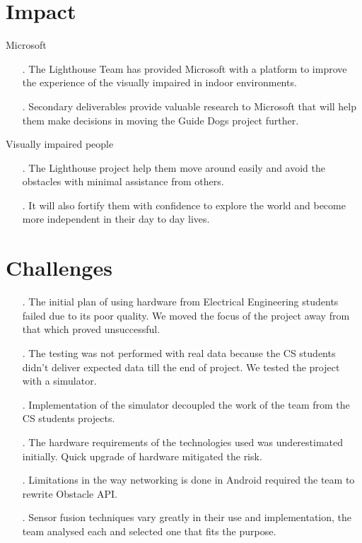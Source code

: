 \documentclass[prodmode,acmtosem]{acmsmall} %
\begin{document}
\section{Impact}
Microsoft
\begin{itemize}
\item[.] The Lighthouse Team has provided Microsoft with a platform to improve the experience of the visually impaired in indoor environments.
\item[.] Secondary deliverables provide valuable research to Microsoft that will help them make decisions in moving the Guide Dogs project further.
\end{itemize}
Visually impaired people
\begin{itemize}
\item[.] The Lighthouse project help them move around easily and avoid the obstacles with minimal assistance from others.
\item[.] It will also fortify them with confidence to explore the world and become more independent in their day to day lives.
\end{itemize}

\section{Challenges}
\begin{itemize}
\item[.] The initial plan of using hardware from Electrical Engineering students failed due to its poor quality. We moved the focus of the project away from that which proved unsuccessful.
\item[.] The testing was not performed with real data because the CS students didn't deliver expected data till the end of project. We tested the project with a simulator.
\item[.] Implementation of the simulator decoupled the work of the team from the CS students projects.
\item[.] The hardware requirements of the technologies used was underestimated initially. Quick upgrade of hardware mitigated the risk.
\item[.] Limitations in the way networking is done in Android required the team to rewrite Obstacle API.
\item[.] Sensor fusion techniques vary greatly in their use and implementation, the team analysed each and selected one that fits the purpose.
\end{itemize}
\end{document}
